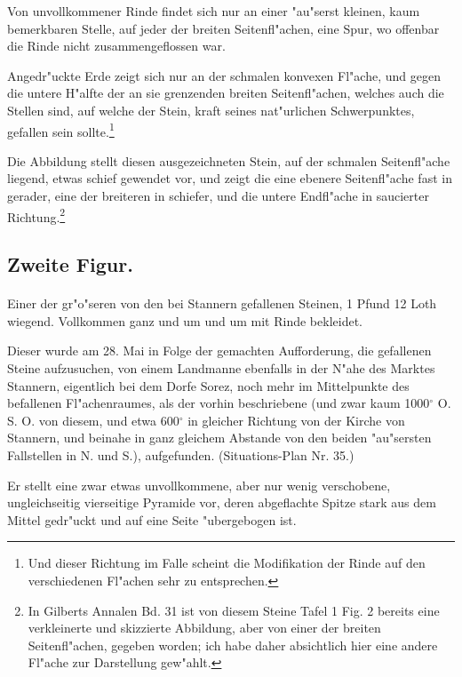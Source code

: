 \documentclass[a4paper, 11pt, oneside, german]{article}
\begin{document}
Von unvollkommener Rinde findet sich nur an einer "au"serst kleinen, kaum bemerkbaren Stelle, auf jeder der breiten Seitenfl"achen, eine Spur, wo offenbar die Rinde nicht zusammengeflossen war.

Angedr"uckte Erde zeigt sich nur an der schmalen konvexen Fl"ache, und gegen die untere H"alfte der an sie grenzenden breiten Seitenfl"achen, welches auch die Stellen sind, auf welche der Stein, kraft seines nat"urlichen Schwerpunktes, gefallen sein sollte.\footnote{Und dieser Richtung im Falle scheint die Modifikation der Rinde auf den verschiedenen Fl"achen sehr zu entsprechen.}

Die Abbildung stellt diesen ausgezeichneten Stein, auf der schmalen Seitenfl"ache liegend, etwas schief gewendet vor, und zeigt die eine ebenere Seitenfl"ache fast in gerader, eine der breiteren in schiefer, und die untere Endfl"ache in saucierter Richtung.\footnote{In Gilberts Annalen Bd. 31 ist von diesem Steine Tafel 1 Fig. 2 bereits eine verkleinerte und skizzierte Abbildung, aber von einer der breiten Seitenfl"achen, gegeben worden; ich habe daher absichtlich hier eine andere Fl"ache zur Darstellung gew"ahlt.}

\subsection{Zweite Figur.}
\paragraph{}
Einer der gr"o"seren von den bei Stannern gefallenen Steinen, 1 Pfund 12 Loth wiegend. Vollkommen ganz und um und um mit Rinde bekleidet.

Dieser wurde am 28. Mai in Folge der gemachten Aufforderung, die gefallenen Steine aufzusuchen, von einem Landmanne ebenfalls in der N"ahe des Marktes Stannern, eigentlich bei dem Dorfe Sorez, noch mehr im Mittelpunkte des befallenen Fl"achenraumes, als der vorhin beschriebene (und zwar kaum 1000$^{\circ}$ O. S. O. von diesem, und etwa 600$^{\circ}$ in gleicher Richtung von der Kirche von Stannern, und beinahe in ganz gleichem Abstande von den beiden "au"sersten Fallstellen in N. und S.), aufgefunden. (Situations-Plan Nr. 35.)

Er stellt eine zwar etwas unvollkommene, aber nur wenig verschobene, ungleichseitig vierseitige Pyramide vor, deren abgeflachte Spitze stark aus dem Mittel gedr"uckt und auf eine Seite "ubergebogen ist.
\end{document}
